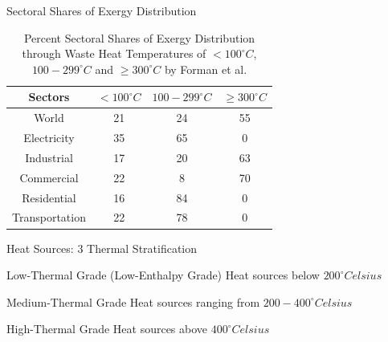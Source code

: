 \begin{frame}{Sectoral Shares of Exergy Distribution}
	\begin{table}
		\centering
		\caption{\centering Percent Sectoral Shares of Exergy Distribution through Waste Heat Temperatures of $<100^{\circ}C$, $100-299^{\circ}C$ and $\geq300^{\circ}C$  by Forman et al. \cite{forman2016estimating}}
		\begin{tabular}{cccc}
			\hline
			Sectors & $<100^{\circ}C$ & $100-299^{\circ}C$ & $\geq300^{\circ}C$\\
			\hline
			World & 21 & 24 & 55\\
			Electricity & 35 & 65 & 0\\
			Industrial & 17 & 20 & 63\\
			Commercial & 22 & 8 & 70\\
			Residential & 16 & 84 & 0\\
			Transportation & 22 & 78 & 0\\
			\hline
		\end{tabular}
	\end{table}
\end{frame}

\begin{frame}{Heat Sources: 3 Thermal Stratification\cite{jouhara2018waste}}
		\begin{alertblock}{Low-Thermal Grade (Low-Enthalpy Grade)}
			Heat sources below $200^{\circ}Celsius$
		\end{alertblock}
	
		\begin{block}{Medium-Thermal Grade}
			Heat sources ranging from $200-400^{\circ}Celsius$
		\end{block}
		
		\begin{block}{High-Thermal Grade}
			Heat sources above $400^{\circ}Celsius$
		\end{block}	
\end{frame}

